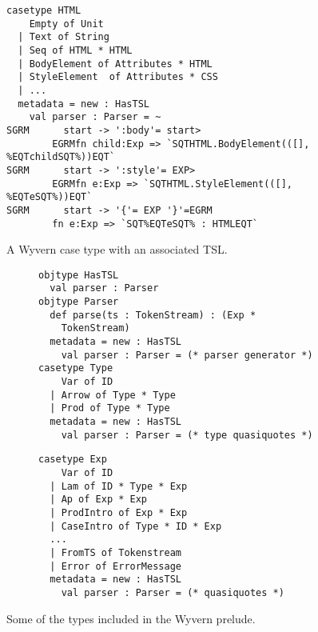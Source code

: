 {\begin{figure}
\begin{lstlisting}[escapechar=$]
casetype HTML 
    Empty of Unit
  | Text of String
  | Seq of HTML * HTML 
  | BodyElement of Attributes * HTML
  | StyleElement  of Attributes * CSS
  | ...
  metadata = new : HasTSL
    val parser : Parser = ~
SGRM      start -> ':body'= start>
        EGRMfn child:Exp => `SQTHTML.BodyElement(([], %EQTchildSQT%))EQT`
SGRM      start -> ':style'= EXP>
        EGRMfn e:Exp => `SQTHTML.StyleElement(([], %EQTeSQT%))EQT`
SGRM      start -> '{'= EXP '}'=EGRM
        fn e:Exp => `SQT%EQTeSQT% : HTMLEQT`
\end{lstlisting}
\vspace{-8px}
\caption{A Wyvern case type with an associated TSL.}
\label{f-htmltype}
\end{figure}
\begin{figure}[t]
\begin{subfigure}[t]{.53\textwidth}
\begin{lstlisting}
objtype HasTSL
  val parser : Parser
objtype Parser                          
  def parse(ts : TokenStream) : (Exp * 
    TokenStream)
  metadata = new : HasTSL
    val parser : Parser = (* parser generator *)      
casetype Type
    Var of ID
  | Arrow of Type * Type
  | Prod of Type * Type
  metadata = new : HasTSL
    val parser : Parser = (* type quasiquotes *)
\end{lstlisting}
\end{subfigure}
\begin{subfigure}[t]{.55\textwidth}
\begin{lstlisting}[linewidth=.5\textwidth]
casetype Exp 
    Var of ID
  | Lam of ID * Type * Exp
  | Ap of Exp * Exp
  | ProdIntro of Exp * Exp
  | CaseIntro of Type * ID * Exp
  ... 
  | FromTS of Tokenstream
  | Error of ErrorMessage
  metadata = new : HasTSL
    val parser : Parser = (* quasiquotes *)
\end{lstlisting}
\end{subfigure}
\caption{Some of the types included in the Wyvern prelude.}
\vspace{-10px}
\label{f-builtins}
\end{figure}

}
